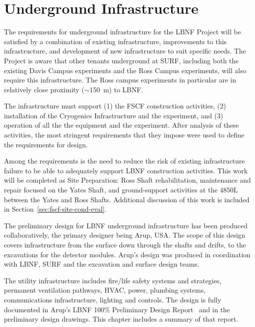 \chapter{Underground Infrastructure}
\label{ch:fscf-und-infra}

The requirements for underground infrastructure for the LBNF Project will be satisfied by a combination of existing infrastructure, improvements to this infrastructure, and development of new infrastructure to suit specific needs. The Project is aware that %
other tenants underground at SURF, %
including both the existing Davis Campus experiments and the Ross Campus experiments, 
will also require this infrastructure. %
The Ross campus experiments in particular are in relatively close proximity ($\sim$150~m) to LBNF.

The infrastructure must support (1) the FSCF %
construction activities, (2) installation of the Cryogenics Infrastructure and the experiment, and (3) operation of all the %
the equipment and the experiment. 
After analysis of these activities, the most stringent requirements that they impose 
were used to define the requirements for design.

Among the requirements is the need to reduce the risk of existing infrastructure failure to be able to adequately support LBNF construction
 activities. This work will be completed as Site Preparation: Ross Shaft rehabilitation,  maintenance and repair focused on the Yates Shaft, and ground-support activities at the 4850L between the Yates and Ross Shafts. Additional discussion of this work is included in Section~\ref{sec:fscf-site-cond-eval}.

The preliminary design for LBNF underground infrastructure has been produced collaboratively, %
the primary designer  %
being Arup, USA. %
The scope of this design covers infrastructure from the surface down through the shafts and drifts, to the excavations for the detector modules. Arup's design  
was produced in coordination with LBNF, SURF and the excavation and surface design teams. 

The utility infrastructure includes fire/life safety systems and strategies, permanent ventilation pathways, %
HVAC, power, plumbing systems, communications infrastructure, lighting and controls. The design is fully documented in Arup's LBNF 100\% Preliminary Design Report~\cite{arup:fscf100pdr} and in the preliminary design drawings. This chapter includes a summary of that report.

